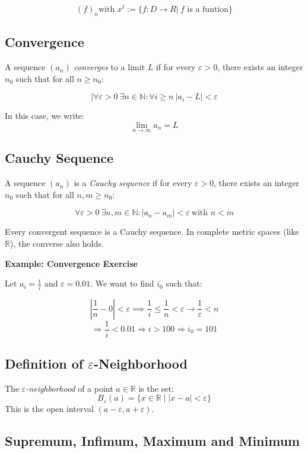 \[
(f)_n \text{with } x^t := \{ f: D\to R | \ f \text{ is a funtion}\}
\]

\subsection{Convergence}

A sequence \((a_n)\) \emph{converges} to a limit \(L\) if for every \(\varepsilon > 0\), there exists an integer \(n_0\) such that for all \(n \ge n_0\):

\[
|\forall \varepsilon > 0\ \exists n \in \mathbb{N}: \forall i \ge n\ |a_i - L| < \varepsilon
\]

In this case, we write:
\[
\lim_{n \to \infty} a_n = L
\]

\subsection{Cauchy Sequence}

A sequence \((a_n)\) is a \emph{Cauchy sequence} if for every \(\varepsilon > 0\), there exists an integer \(n_0\) such that for all \(n, m \ge n_0\):

\[
\forall \varepsilon > 0\ \exists n,m \in \mathbb{N}: |a_n - a_m| < \varepsilon\ \text{with } n < m
\]

Every convergent sequence is a Cauchy sequence. In complete metric spaces (like \(\mathbb{R}\)), the converse also holds.

\textbf{Example: Convergence Exercise}

Let \(a_i = \frac{1}{i}\) and \(\varepsilon = 0.01\). We want to find \(i_0\) such that:

\[
\left|\frac{1}{n} - 0\right| < \varepsilon \implies \frac{1}{i} \le \frac{1}{n} < \varepsilon \rightarrow \frac{1}{\varepsilon} < n
\]
\[
\Rightarrow \frac{1}{i} < 0.01 \Rightarrow i > 100
\Rightarrow i_0 = 101
\]

\subsection{Definition of \texorpdfstring{\(\varepsilon\)}{ε}-Neighborhood}

The \emph{\(\varepsilon\)-neighborhood} of a point \(a \in \mathbb{R}\) is the set:
\[
B_\varepsilon(a) = \{x \in \mathbb{R} \mid |x - a| < \varepsilon\}
\]
This is the open interval \((a - \varepsilon, a + \varepsilon)\).

\subsection{Supremum, Infimum, Maximum and Minimum}

